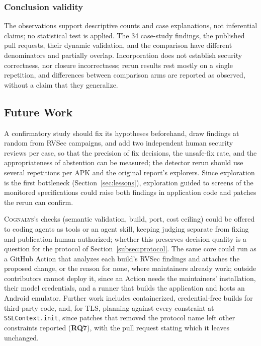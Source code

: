 \documentclass[conference]{IEEEtran}
\newcommand{\system}{\textsc{Cognalys}}
\newcommand{\researchq}[1]{\textbf{RQ#1}}
\begin{document}
\subsubsection{Conclusion validity}

The observations support descriptive counts and case explanations, not
inferential claims; no statistical test is applied. The 34 case-study
findings, the published pull requests, their dynamic validation, and the
comparison have different denominators and partially overlap. Incorporation
does not establish security correctness, nor closure incorrectness; rerun
results rest mostly on a single repetition, and differences between comparison
arms are reported as observed, without a claim that they generalize.

\subsection{Future Work}
\label{subsec:future}

A confirmatory study should fix its hypotheses beforehand, draw findings at
random from RVSec campaigns, and add two independent human security reviews
per case, so that the precision of fix decisions, the unsafe-fix rate, and
the appropriateness of abstention can be measured; the detector rerun should
use several repetitions per APK and the original report's explorers. Since
exploration is the first bottleneck (Section~\ref{sec:lessons}), exploration
guided to screens of the monitored specifications could raise both findings in
application code and patches the rerun can confirm.

\system{}'s checks (semantic validation, build, port, cost ceiling) could be
offered to coding agents as tools or an agent skill, keeping judging separate
from fixing and publication human-authorized; whether this preserves decision
quality is a question for the protocol of Section~\ref{subsec:protocol}. The same core could run as a GitHub
Action that analyzes each build's RVSec findings and attaches the proposed
change, or the reason for none, where maintainers already work; outside
contributors cannot deploy it, since an Action needs the maintainers'
installation, their model credentials, and a runner that builds the application
and hosts an Android emulator. Further work includes containerized, credential-free
builds for third-party code, and, for TLS, planning against every constraint
at \texttt{SSLContext.init}, since patches that removed the protocol name left
other constraints reported (\researchq{7}), with the pull request stating which
it leaves unchanged.
\end{document}

